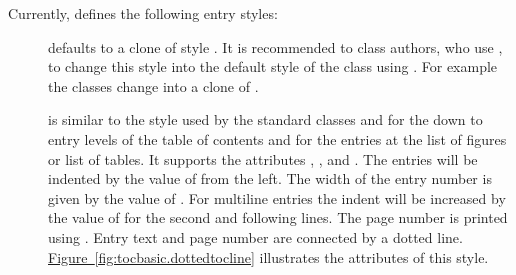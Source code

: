 Currently,  defines the following entry styles:
\begin{description}
\item[] defaults to a clone of style
  . It is recommended to class authors, who use
  , to change this style into the default style of the class
  using . For example the \KOMAScript{} classes change
   into a clone of .
\item[] is similar to the style used by the standard
  classes  and  for the  down to
   entry levels of the table of contents and for the
  entries at the list of figures or list of tables. It supports the attributes
  , , and . The entries will be
  indented by the value of  from the left. The width of the
  entry number is given by the value of . For multiline
  entries the indent will be increased by the value of  for
  the second and following lines. The page number is printed using
  . Entry text and page number are
  connected by a dotted line. \hyperref[fig:tocbasic.dottedtocline]%
  {Figure~\ref*{fig:tocbasic.dottedtocline}} illustrates the attributes of
  this style.
  \begin{figure}
    \centering
\end{figure}
\end{description}
